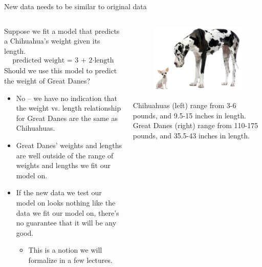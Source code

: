 \documentclass[aspectratio=169]{../latex_main/tntbeamer}  %
\begin{document}
	
	\begin{frame}{New data needs to be similar to original data}
	    \begin{columns}
    	    \begin{column}{.7\textwidth}
    	           Suppose we fit a model that predicts a Chihuahua’s weight given its length.
            	    \begin{align*}
            	           \text{predicted weight = 3 + 2$\cdot$length}
            	    \end{align*}
            	    Should we use this model to predict the weight of Great Danes? 
            	    \begin{itemize}
            	        \item No – we have no indication that the weight vs. length relationship for Great Danes are the same as Chihuahuas.
            	        \item Great Danes’ weights and lengths are well outside of the range of weights and lengths we fit our model on.
            	        \item If the new data we test our model on looks nothing like the data we fit our model on, there’s no guarantee that it will be any good.
            	        \begin{itemize}
            	            \item This is a notion we will formalize in a few lectures.
            	        \end{itemize}
            	     \end{itemize}
    	    \end{column}
	  
	        \begin{column}{.3\textwidth}
    	           \begin{figure}
    	               \includegraphics[scale=.3]{Bild7}
    	           \end{figure}
    	           Chihuahuas (left) range from 3-6 pounds, and 9.5-15 inches in length. Great Danes (right) range from 110-175 pounds, and 35.5-43 inches in length.
    	    \end{column}
	       \end{columns}
	\end{frame}
	
\end{document}
